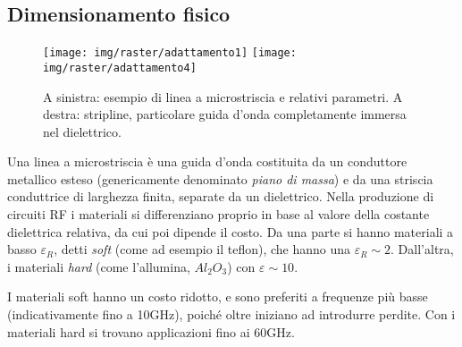




%
%
%
%
%
%
%
%

\subsection{Dimensionamento fisico}
\begin{figure}[hbt]
	\centering
	\texttt{[image: img/raster/adattamento1]}
	\texttt{[image: img/raster/adattamento4]}
	\caption{A sinistra: esempio di linea a microstriscia e relativi parametri. A destra: stripline, particolare guida d'onda completamente immersa nel dielettrico.}
	\label{fig:microstriscia}
\end{figure}
Una linea a microstriscia è una guida d'onda costituita da un conduttore metallico esteso (genericamente denominato \textit{piano di massa})  e da una striscia conduttrice di larghezza finita, separate da un dielettrico.
Nella produzione di circuiti RF i materiali si differenziano proprio in base al valore della costante dielettrica relativa, da cui poi dipende il costo. Da una parte si hanno materiali a basso $\varepsilon_R$, detti \textit{soft} (come ad esempio il teflon), che hanno una $\varepsilon_R \sim 2$. Dall'altra, i materiali \textit{hard} (come l'allumina, $Al_2O_3$) con $\varepsilon \sim 10$.

I materiali soft hanno un costo ridotto, e sono preferiti a frequenze più basse (indicativamente fino a 10GHz), poiché oltre iniziano ad introdurre perdite. Con i materiali hard si trovano applicazioni fino ai 60GHz. 

